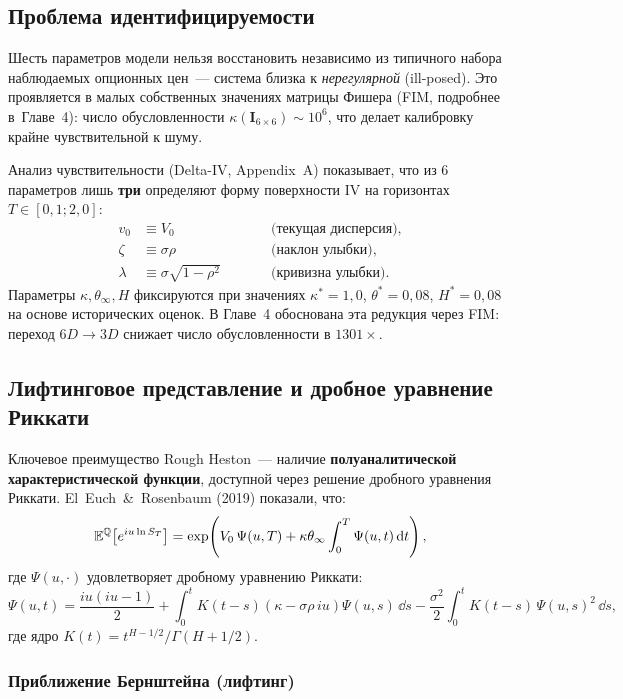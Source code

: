 \subsection{Проблема идентифицируемости}

Шесть параметров модели нельзя восстановить независимо из типичного набора
наблюдаемых опционных цен~--- система близка к \textit{нерегулярной} (ill-posed).
Это проявляется в малых собственных значениях матрицы Фишера (FIM, подробнее
в~Главе~4): число обусловленности $\kappa(\mathbf{I}_{6\times 6}) \sim 10^6$,
что делает калибровку крайне чувствительной к шуму.

Анализ чувствительности (Delta-IV, Appendix~A) показывает, что из 6 параметров
лишь \textbf{три} определяют форму поверхности IV на горизонтах $T \in [0{,}1; 2{,}0]$:
\begin{align}
  v_0 &\equiv V_0 \qquad &&\text{(текущая дисперсия)}, \\
  \zeta &\equiv \sigma\rho \qquad &&\text{(наклон улыбки)}, \\
  \lambda &\equiv \sigma\sqrt{1 - \rho^2} \qquad &&\text{(кривизна улыбки)}.
\end{align}
Параметры $\kappa, \theta_{\infty}, H$ фиксируются при значениях
$\kappa^* = 1{,}0$, $\theta^* = 0{,}08$, $H^* = 0{,}08$
на основе исторических оценок. В Главе~4 обоснована эта редукция через FIM:
переход $6D \to 3D$ снижает число обусловленности в $1301\times$.

\subsection{Лифтинговое представление и дробное уравнение Риккати}

Ключевое преимущество Rough Heston~--- наличие \textbf{полуаналитической
характеристической функции}, доступной через решение дробного уравнения Риккати.
El~Euch~\&~Rosenbaum (2019) показали, что:
\[
  \mathbb{E}^{\mathbb{Q}}\!\left[e^{iu \ln S_T}\right]
  = \exp\!\left(V_0\,\Psi(u,T)
    + \kappa\theta_{\infty} \int_0^T \Psi(u,t)\,\mathrm{d} t\right),
\]
где $\Psi(u, \cdot)$ удовлетворяет дробному уравнению Риккати:
\begin{equation}
  \label{eq:riccati_frac}
  \Psi(u, t)
  = \frac{iu(iu-1)}{2} + \int_0^t K(t-s)
    \left(\kappa - \sigma\rho\,iu\right)\Psi(u,s)\,\dd s
  - \frac{\sigma^2}{2}\int_0^t K(t-s)\,\Psi(u,s)^2\,\dd s,
\end{equation}
где ядро $K(t) = t^{H-1/2}/\Gamma(H+1/2)$.

\subsubsection{Приближение Бернштейна (лифтинг)}

